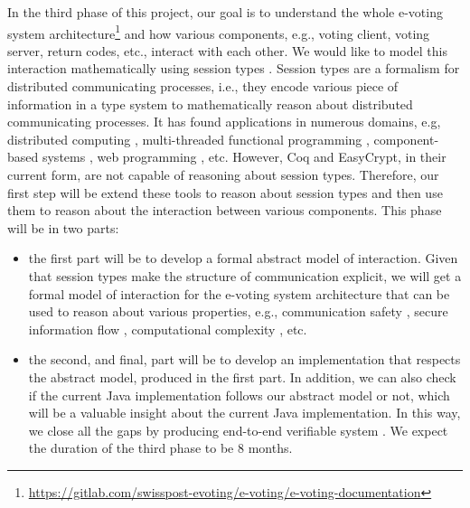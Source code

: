 \documentclass[a4paper]{article}
\begin{document}
In the third phase of this project, our goal is to understand the whole 
e-voting system architecture\footnote{\url{https://gitlab.com/swisspost-evoting/e-voting/e-voting-documentation}} 
and how various components, e.g., voting client, voting server, return codes, etc., 
interact with each other. We would like to model this 
interaction mathematically using session types \cite{10.1007/978-3-642-38592-6_5}. 
Session types are a formalism for distributed communicating processes, i.e., 
they encode various piece of information in a type system to mathematically reason about 
distributed communicating processes. It has found applications in numerous domains, e.g, 
distributed computing \cite{10.1145/3290341}, 
multi-threaded functional programming \cite{vasconcelos2006type},
component-based systems \cite{vallecillo2003typing}, web programming \cite{10.1145/3446804.3446854}, etc. 
However, Coq and EasyCrypt, in their current form, are not capable of reasoning about session types. 
Therefore, our first step will be extend these tools to reason about 
session types \cite{ZFHNY2020} and then use them to reason about the interaction between 
various components. This phase will be in two parts:
\begin{itemize}
  \item the first part will be to develop a formal abstract model of interaction.  Given that session types 
  make the structure of communication explicit, we will get a formal model of interaction for 
  the e-voting system architecture that can be used to reason about 
  various properties, e.g., communication safety \cite{TONINHO201761},
  secure information flow \cite{10.1007/978-3-642-15375-4_17}, computational complexity \cite{10.1145/3209108.3209122},
  etc. 

  \item the second, and final, part will be to develop an implementation that
  respects the abstract model, produced in the first part. In addition, 
  we can also check if the current Java implementation follows our 
  abstract model or not, which will be a valuable insight about the current Java implementation.
  In this way, we close all the gaps by producing end-to-end verifiable system \cite{4271648, ZFHNY2020, basin}.
  We expect the duration of the third phase to be 8 months.

\end{itemize}
\end{document}

